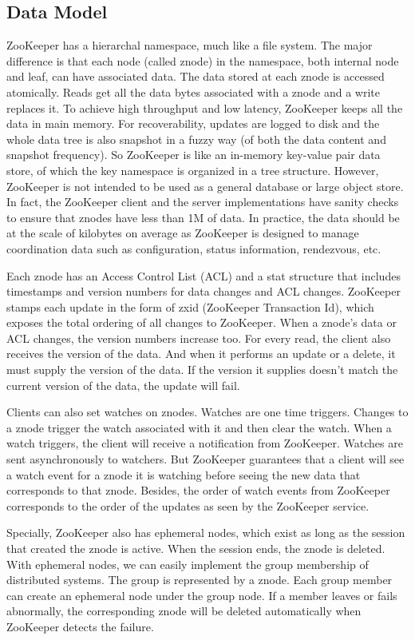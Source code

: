\documentclass[11pt]{book}
\begin{document}
\subsection{Data Model}
ZooKeeper has a hierarchal namespace, much like a file system. The major difference is that each node (called znode) in the namespace, both internal node and leaf, can have associated data. The data stored at each znode is accessed atomically. Reads get all the data bytes associated with a znode and a write replaces it. To achieve high throughput and low latency, ZooKeeper keeps all the data in main memory. For recoverability, updates are logged to disk and the whole data tree is also snapshot in a fuzzy way (of both the data content and snapshot frequency). So ZooKeeper is like an in-memory key-value pair data store, of which the key namespace is organized in a tree structure. However, ZooKeeper is not intended to be used as a general database or large object store. In fact, the ZooKeeper client and the server implementations have sanity checks to ensure that znodes have less than 1M of data. In practice, the data should be at the scale of kilobytes on average as ZooKeeper is designed to manage coordination data such as configuration, status information, rendezvous, etc. 

Each znode has an Access Control List (ACL) and a stat structure that includes timestamps and version numbers for data changes and ACL changes. ZooKeeper stamps each update in the form of zxid (ZooKeeper Transaction Id), which exposes the total ordering of all changes to ZooKeeper. When a znode's data or ACL changes, the version numbers increase too. For every read, the client also receives the version of the data. And when it performs an update or a delete, it must supply the version of the data. If the version it supplies doesn't match the current version of the data, the update will fail.

Clients can also set watches on znodes. Watches are one time triggers. Changes to a znode trigger the watch associated with it and then clear the watch. When a watch triggers, the client will receive a notification from ZooKeeper. Watches are sent asynchronously to watchers. But ZooKeeper guarantees that a client will see a watch event for a znode it is watching before seeing the new data that corresponds to that znode. Besides, the order of watch events from ZooKeeper corresponds to the order of the updates as seen by the ZooKeeper service.

Specially, ZooKeeper also has ephemeral nodes, which exist as long as the session that created the znode is active. When the session ends, the znode is deleted. With ephemeral nodes, we can easily implement the group membership of distributed systems. The group is represented by a znode. Each group member can create an ephemeral node under the group node. If a member leaves or fails abnormally, the corresponding znode will be deleted automatically when ZooKeeper detects the failure.
\end{document}

